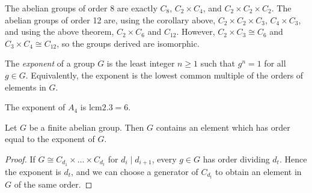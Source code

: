 \begin{example}
	The abelian groups of order 8 are exactly $C_8$, $C_2 \times C_4$, and $C_2 \times C_2 \times C_2$.
	The abelian groups of order 12 are, using the corollary above, $C_2 \times C_2 \times C_3$, $C_4 \times C_3$, and using the above theorem, $C_2 \times C_6$ and $C_{12}$.
	However, $C_2 \times C_3 \cong C_6$ and $C_3 \times C_4 \cong C_{12}$, so the groups derived are isomorphic.
\end{example}
\begin{definition}
	The \textit{exponent} of a group $G$ is the least integer $n \geq 1$ such that $g^n = 1$ for all $g \in G$.
	Equivalently, the exponent is the lowest common multiple of the orders of elements in $G$.
\end{definition}
\begin{example}
	The exponent of $A_4$ is $\mathrm{lcm}\qty{2, 3} = 6$.
\end{example}
\begin{corollary}
	Let $G$ be a finite abelian group.
	Then $G$ contains an element which has order equal to the exponent of $G$.
\end{corollary}
\begin{proof}
	If $G \cong C_{d_1} \times \dots \times C_{d_t}$ for $d_i \mid d_{i+1}$, every $g \in G$ has order dividing $d_t$.
	Hence the exponent is $d_t$, and we can choose a generator of $C_{d_t}$ to obtain an element in $G$ of the same order.
\end{proof}
